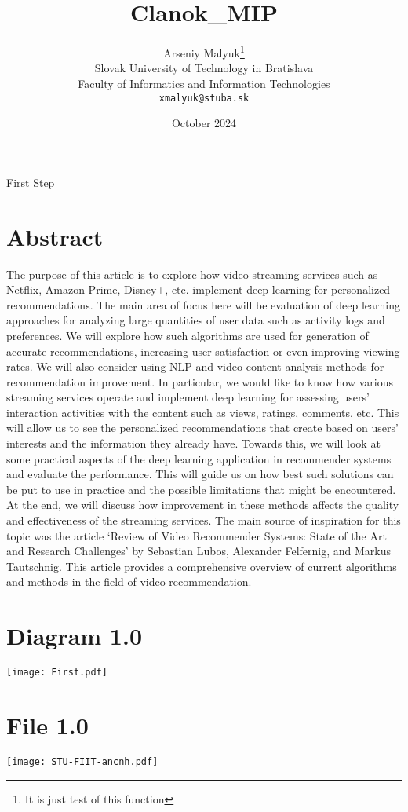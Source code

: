 \documentclass[10pt,twocolumn,twoside,a4paper]{article}
\title{Clanok_MIP}
\author{Arseniy Malyuk\thanks{It is just test of this function}\\[2pt]
	{\small Slovak University of Technology in Bratislava}\\
	{\small Faculty of Informatics and Information Technologies}\\
	{\small \texttt{xmalyuk@stuba.sk}}
	}
\date{October 2024}
\begin{document}
 
\maketitle
First Step

\section{Abstract}
The purpose of this article is to explore how video streaming services such as Netflix, Amazon Prime, Disney+, etc. implement deep learning for personalized recommendations. The main area of focus here will be evaluation of deep learning approaches for analyzing large quantities of user data such as activity logs and preferences. We will explore how such algorithms are used for generation of accurate recommendations, increasing user satisfaction or even improving viewing rates. We will also consider using NLP and video content analysis methods for recommendation improvement. In particular, we would like to know how various streaming services operate and implement deep learning for assessing users’ interaction activities with the content such as views, ratings, comments, etc. This will allow us to see the personalized recommendations that create based on users’ interests and the information they already have. Towards this, we will look at some practical aspects of the deep learning application in recommender systems and evaluate the performance. This will guide us on how best such solutions can be put to use in practice and the possible limitations that might be encountered. At the end, we will discuss how improvement in these methods affects the quality and effectiveness of the streaming services. The main source of inspiration for this topic was the article ‘Review of Video Recommender Systems: State of the Art and Research Challenges’ by Sebastian Lubos, Alexander Felfernig, and Markus Tautschnig. This article provides a comprehensive overview of current algorithms and methods in the field of video recommendation.

\section{Diagram 1.0}
\texttt{[image: First.pdf]}

\section{File 1.0}
\texttt{[image: STU-FIIT-ancnh.pdf]}
\end{document}
